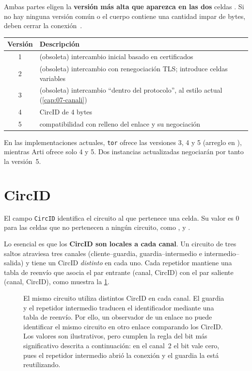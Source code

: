 Ambas partes eligen la \textbf{versión más alta que aparezca en las dos} celdas . Si no hay ninguna versión común o el cuerpo contiene una cantidad impar de bytes, deben cerrar la conexión~.

\begin{center}
\begin{tabular}{cl}
\toprule
Versión & Descripción \\
\midrule
1 & (obsoleta) intercambio inicial basado en certificados \\
2 & (obsoleta) intercambio con renegociación TLS; introduce celdas variables \\
3 & (obsoleta) intercambio \enquote{dentro del protocolo}, al estilo actual (\cref{cap:07-canali}) \\
4 & CircID de 4 bytes \\
5 & compatibilidad con relleno del enlace y su negociación \\
\bottomrule
\end{tabular}
\end{center}

En las implementaciones actuales, \texttt{tor} ofrece las versiones 3, 4 y 5 (arreglo  en ), mientras Arti ofrece solo 4 y 5. Dos instancias actualizadas negociarán por tanto la versión~5.

\section{CircID}\label{sec:circid}

El campo \texttt{CircID} identifica el circuito al que pertenece una celda. Su valor es 0 para las celdas que no pertenecen a ningún circuito, como ,  y .

Lo esencial es que los \textbf{CircID son locales a cada canal}. Un circuito de tres saltos atraviesa tres canales (cliente--guardia, guardia--intermedio e intermedio--salida) y tiene un CircID \emph{distinto} en cada uno. Cada repetidor mantiene una tabla de reenvío que asocia el par entrante (canal, CircID) con el par saliente (canal, CircID), como muestra la \cref{fig:circid-locale}.

\begin{figure}[htbp]
\centering

\caption{El mismo circuito utiliza distintos CircID en cada canal. El guardia y el repetidor intermedio traducen el identificador mediante una tabla de reenvío. Por ello, un observador de un enlace no puede identificar el mismo circuito en otro enlace comparando los CircID. Los valores son ilustrativos, pero cumplen la regla del bit más significativo descrita a continuación: en el canal~2 el bit vale cero, pues el repetidor intermedio abrió la conexión y el guardia la está reutilizando.}
\label{fig:circid-locale}
\end{figure}

